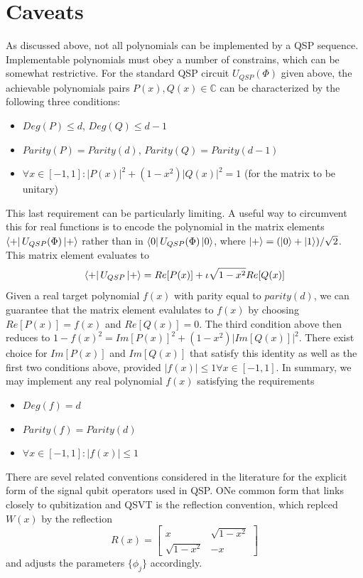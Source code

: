 \documentclass[12pt, oneside]{book}
\theoremstyle{definition}
\theoremstyle{definition}
\theoremstyle{remark}
\begin{document}
\section{Caveats}
As discussed above, not all polynomials can be implemented by a QSP sequence. Implementable polynomials must obey a number of constrains, which can be somewhat restrictive. For the standard QSP circuit $U_{QSP}(\Phi)$ given above, the achievable polynomials pairs $P(x),Q(x)\in\mathbb{C}$ can be characterized by the following three conditions:
\begin{itemize}
    \item $Deg(P)\leq d$, $Deg(Q)\leq d-1$
    \item $Parity(P)=Parity(d)$, $Parity(Q)=Parity(d-1)$
    \item $\forall x \in [-1,1]: |P(x)|^2 + (1-x^2)|Q(x)|^2=1$ (for the matrix to be unitary)
\end{itemize}
This last requirement can be particularly limiting. A useful way to circumvent this for real functions is to encode the polynomial in the matrix elements $\bra{+}U_{QSP}(\Phi)\ket{+}$ rather than in $\bra{0}U_{QSP}(\Phi)\ket{0}$, where $\ket{+}=(\ket{0}+\ket{1})/\sqrt{2}$. This matrix element evaluates to
\[
\bra{+}U_{QSP}\ket{+}=Re[P(x)]+\iota \sqrt{1-x^2}Re[Q(x)]
\]
Given a real target polynomial $f(x)$ with parity equal to $parity(d)$, we can guarantee that the matrix element evalulates to $f(x)$ by choosing $Re[P(x)]=f(x)$ and $Re[Q(x)]=0$. The third condition above then reduces to $1-f(x)^2=Im[P(x)]^2+(1-x^2)|Im[Q(x)]|^2$. There exist choice for $Im[P(x)]$ and $Im[Q(x)]$ that satisfy this identity as well as the first two conditions above, provided $|f(x)|\leq 1 \forall x \in[-1,1]$. In summary, we may implement any real polynomial $f(x)$ satisfying the requirements
\begin{itemize}
    \item $Deg(f)=d$
    \item $Parity(f)=Parity(d)$
    \item $\forall x\in[-1,1]:|f(x)|\leq 1$
\end{itemize}
There are sevel related conventions considered in the literature for the explicit form of the signal qubit operators used in QSP. ONe common form that links closely to qubitization and QSVT is the reflection convention, which replced $W(x)$ by the reflection
\[
R(x)=\begin{bmatrix}
    x & \sqrt{1-x^2}\\
    \sqrt{1-x^2} & -x
\end{bmatrix}
\]
and adjusts the parameters $\{\phi_j\}$ accordingly.
\end{document}
